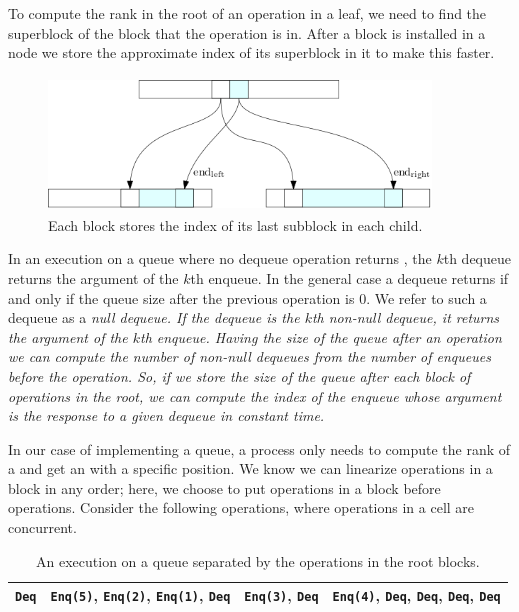 To compute the rank in the root of an operation in a leaf, we need to
find the superblock of the block that the operation is in. After a
block is installed in a node we store the approximate index of its
superblock in it to make this faster. 

\begin{figure}[hbtp]
\centering
  \includegraphics[width=4in, height=1.4in]{pics/pointers}
  \caption{Each block stores the index of its last subblock in each
    child. \label{fig::pointer}} 
\end{figure}

In an execution on a queue where no dequeue operation returns
, the $k$th dequeue returns the argument of the $k$th
enqueue. In the general case a dequeue returns  if and only
if the queue size after the previous operation is 0. We refer to such
a dequeue as a \it{null dequeue}. If the dequeue is the $k$th non-null
dequeue, it returns the argument of the $k$th enqueue. Having the size
of the queue after an operation we can compute the number of non-null
dequeues from the number of enqueues before the operation. So, if we
store the size of the queue after each block of operations in the
root, we can compute the index of the enqueue whose argument is the
response to a given dequeue in constant time. 

In our case of implementing a queue, a process only needs to compute
the rank of a  and get an  with a specific
position.  We know we can linearize operations in a block in any
order; here, we choose to put  operations in a block
before  operations. Consider the following operations,
where operations in a cell are concurrent. 
\begin{table}[hbtp]
\centering
\begin{small}
\begin{tabular}{c|c|c|c}
    \hline \texttt{Deq} & \texttt{Enq(5)}, \texttt{Enq(2)}, \texttt{Enq(1)}, \texttt{Deq}& \texttt{Enq(3)}, \texttt{Deq}&  \texttt{Enq(4)}, \texttt{Deq}, \texttt{Deq}, \texttt{Deq}, \texttt{Deq}\\ \hline
  \end{tabular}
\end{small}
\caption{An execution on a queue separated by the operations in the root blocks.}
\end{table}

